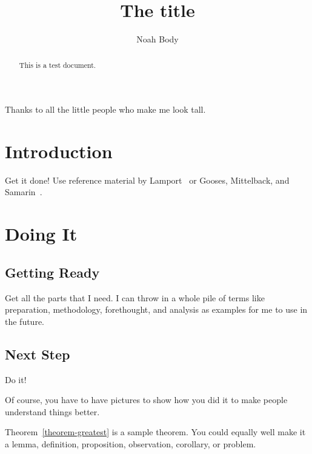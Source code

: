 \documentclass[12pt]{dalcsthesis}
\begin{document}
\mcs  %
\title{The title}
\author{Noah Body}



\nolistoftables
\nolistoffigures

\frontmatter

\begin{abstract}
This is a test document.
\end{abstract}

\begin{acknowledgements}
Thanks to all the little people who make me look tall.
\end{acknowledgements}

\mainmatter

\chapter{Introduction}

Get it done!  Use reference material by Lamport~\cite{latex-by-lamport} or
Gooses, Mittelback, and Samarin~\cite{latex-companion}.

\chapter{Doing It}

\section{Getting Ready}

Get all the parts that I need.  I can throw in a whole pile of terms like
preparation,
methodology,
forethought,
and
analysis
as examples for me to use in the future.

\section{Next Step}

Do it!

Of course, you have to have pictures to show how you did it to make people
understand things better.

Theorem~\ref{theorem-greatest} is a sample theorem.  You could equally well
make it a lemma, definition, proposition, observation, corollary, or problem.
\end{document}
